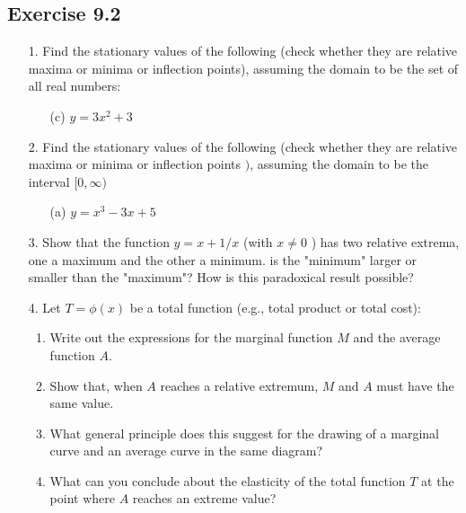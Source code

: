 \documentclass{./../../Latex/homework}
\begin{document}
\thispagestyle{plain}
\newcommand{\mytitle}{Homework 8 Problems}
\myheader{\mytitle}

\subsection*{Exercise 9.2}

\begin{enumerate}

\item[1.] Find the stationary values of the following (check whether they are relative maxima or minima or inflection points), assuming the domain to be the set of all real numbers:
\begin{itemize}
\item[(c)] $y=3 x^{2}+3$
\end{itemize}

\item[2.] Find the stationary values of the following (check whether they are relative maxima or minima or inflection points $)$, assuming the domain to be the interval $[0, \infty)$ 
\begin{itemize}
\item[(a)] $y=x^{3}-3 x+5$
\end{itemize}

\item[3.] Show that the function $y=x+1 / x$ (with $x \neq 0$ ) has two relative extrema, one a maximum and the other a minimum. is the "minimum" larger or smaller than the "maximum"? How is this paradoxical result possible?

\item[4.] Let $T=\phi(x)$ be a total function (e.g., total product or total cost):
\begin{enumerate}
  \item Write out the expressions for the marginal function $M$ and the average function $A$.
  \item Show that, when $A$ reaches a relative extremum, $M$ and $A$ must have the same value.
  \item What general principle does this suggest for the drawing of a marginal curve and an average curve in the same diagram?
  \item What can you conclude about the elasticity of the total function $T$ at the point where $A$ reaches an extreme value?
\end{enumerate}


\end{enumerate}
\end{document}
